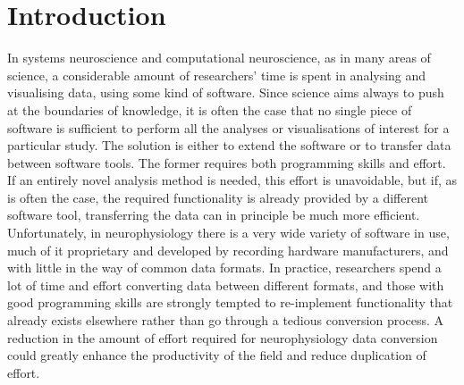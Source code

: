 \documentclass{frontiers}
\begin{document}
\section{Introduction}



In systems neuroscience and computational neuroscience, as in many areas of science, a considerable amount of researchers' time is spent in analysing and visualising data, using some kind of software.
Since science aims always to push at the boundaries of knowledge, it is often the case that no single piece of software is sufficient to perform all the analyses or visualisations of interest for a particular study.
The solution is either to extend the software or to transfer data between software tools.
The former requires both programming skills and effort.
If an entirely novel analysis method is needed, this effort is unavoidable, but if, as is often the case, the required functionality is already provided by a different software tool, transferring the data can in principle be much more efficient.
Unfortunately, in neurophysiology there is a very wide variety of software in use, much of it proprietary and developed by recording hardware manufacturers, and with little in the way of common data formats.
In practice, researchers spend a lot of time and effort converting data between different formats, and those with good programming skills are strongly tempted to re-implement functionality that already exists elsewhere rather than go through a tedious conversion process.
A reduction in the amount of effort required for neurophysiology data conversion could greatly enhance the productivity of the field and reduce duplication of effort. 
\end{document}
